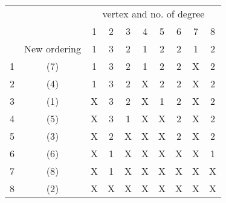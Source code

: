 \documentclass{standalone}
\begin{document}
    \begin{tabular}{cc|cccccccc}
	\multicolumn{2}{p{1.5cm}|}{} &
	\multicolumn{8}{c}{vertex and no. of degree} \\
	\small
	&               & 1 & 2 & 3 & 4 & 5 & 6 & 7 & 8 \\
	&New ordering   & 1 & 3 & 2 & 1 & 2 & 2 & 1 & 2 \\
	\hline
	1  &(7)            & 1 & 3 & 2 & 1 & 2 & 2 & X & 2 \\
	2  &(4)            & 1 & 3 & 2 & X & 2 & 2 & X & 2 \\
	3  &(1)            & X & 3 & 2 & X & 1 & 2 & X & 2 \\
	4  &(5)            & X & 3 & 1 & X & X & 2 & X & 2 \\
	5  &(3)            & X & 2 & X & X & X & 2 & X & 2 \\
	6  &(6)            & X & 1 & X & X & X & X & X & 1 \\
	7  &(8)            & X & 1 & X & X & X & X & X & X \\
	8  &(2)            & X & X & X & X & X & X & X & X \\
\end{tabular}
\end{document}
